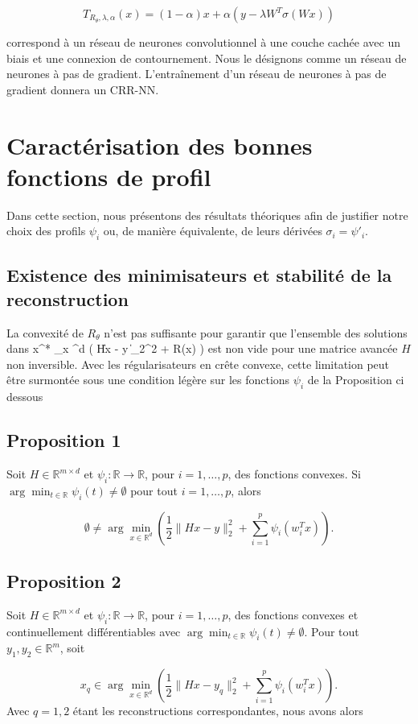 \documentclass[a4paper, 12pt]{report} %
\begin{document}
\[
T_{R_\theta,\lambda,\alpha}(x) = (1 - \alpha)x + \alpha \left( y - \lambda W^T \sigma(Wx) \right)
\]

correspond à un réseau de neurones convolutionnel à une couche cachée avec un biais et une connexion de contournement. Nous le désignons comme un réseau de neurones à pas de gradient. L'entraînement d'un réseau de neurones à pas de gradient donnera un CRR-NN.
\section{Caractérisation des bonnes fonctions de profil}
Dans cette section, nous présentons des résultats théoriques afin de justifier notre choix des profils \( \psi_i \) ou, de manière équivalente, de leurs dérivées \( \sigma_i = \psi'_i \).
\subsection{Existence des minimisateurs et stabilité de la reconstruction}
La convexité de \( R_\theta \) n'est pas suffisante pour garantir que l'ensemble des solutions dans x^* \in \arg \min_{x \in {}^d} \left( \| Hx - y \|_2^2 + R(x) \right)
\] est non vide pour une matrice avancée \( H \) non inversible. Avec les régularisateurs en crête convexe, cette limitation peut être surmontée sous une condition légère sur les fonctions \( \psi_i \) de la Proposition ci dessous
\subsection*{Proposition 1}
Soit \( H \in \mathbb{R}^{m \times d} \) et \( \psi_i : \mathbb{R} \to \mathbb{R} \), pour \( i = 1, \ldots, p \), des fonctions convexes. Si \( \arg \min_{t \in \mathbb{R}} \psi_i(t) \neq \emptyset \) pour tout \( i = 1, \ldots, p \), alors 

\[
\emptyset \neq \arg \min_{x \in \mathbb{R}^d} \left( \frac{1}{2} \| Hx - y \|_2^2 + \sum_{i=1}^p \psi_i(w_i^T x) \right).
\]
\subsection*{Proposition 2}
Soit \( H \in \mathbb{R}^{m \times d} \) et \( \psi_i : \mathbb{R} \to \mathbb{R} \), pour \( i = 1, \ldots, p \), des fonctions convexes et continuellement différentiables avec \( \arg \min_{t \in \mathbb{R}} \psi_i(t) \neq \emptyset \). Pour tout \( y_1, y_2 \in \mathbb{R}^m \), soit 

\[
x_q \in \arg \min_{x \in \mathbb{R}^d} \left( \frac{1}{2} \| Hx - y_q \|_2^2 + \sum_{i=1}^p \psi_i(w_i^T x) \right).
\]
Avec \( q = 1, 2 \) étant les reconstructions correspondantes, nous avons alors 
\end{document}
